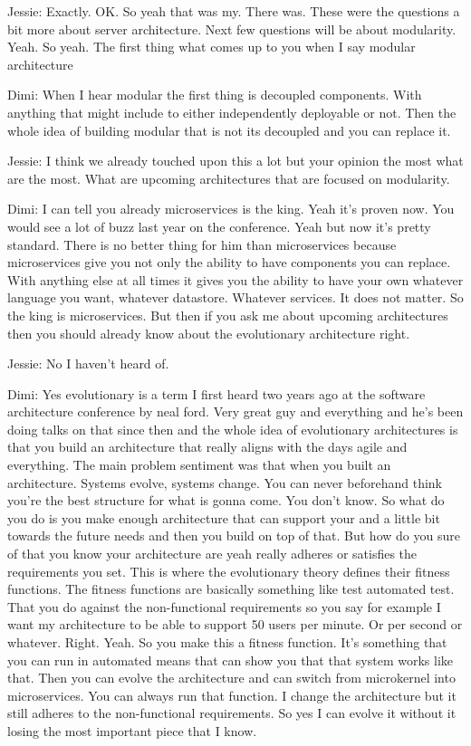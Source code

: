 Jessie: Exactly. OK. So yeah that was my. There was. These were the questions a bit more about server architecture. Next few questions will be about modularity. Yeah. So yeah. The first thing what comes up to you when I say modular architecture

Dimi: When I hear modular the first thing is decoupled components. With anything that might include to either independently deployable or not. Then the whole idea of building modular that is not its decoupled and you can replace it.

Jessie: I think we already touched upon this a lot but your opinion the most what are the most. What are upcoming architectures that are focused on modularity.

Dimi: I can tell you already microservices is the king. Yeah it's proven now. You would see a lot of buzz last year on the conference. Yeah but now it's pretty standard. There is no better thing for him than microservices because microservices give you not only the ability to have components you can replace. With anything else at all times it gives you the ability to have your own whatever language you want, whatever datastore. Whatever services. It does not matter. So the king is microservices. But then if you ask me about upcoming architectures then you should already know about the evolutionary architecture right.

Jessie: No I haven't heard of.

Dimi: Yes evolutionary is a term I first heard two years ago at the software architecture conference by neal ford. Very great guy and everything and he's been doing talks on that since then and the whole idea of evolutionary architectures is that you build an architecture that really aligns with the days agile and everything. The main problem sentiment was that when you built an architecture. Systems evolve, systems change. You can never beforehand think you're the best structure for what is gonna come. You don't know. So what do you do is you make enough architecture that can support your and a little bit towards the future needs and then you build on top of that. But how do you sure of that you know your architecture are yeah really adheres or satisfies the requirements you set. This is where the evolutionary theory defines their fitness functions. The fitness functions are basically something like test automated test. That you do against the non-functional requirements so you say for example I want my architecture to be able to support 50 users per minute. Or per second or whatever. Right. Yeah. So you make this a fitness function. It's something that you can run in automated means that can show you that that system works like that. Then you can evolve the architecture and can switch from microkernel into microservices. You can always run that function. I change the architecture but it still adheres to the non-functional requirements. So yes I can evolve it without it losing the most important piece that I know.

